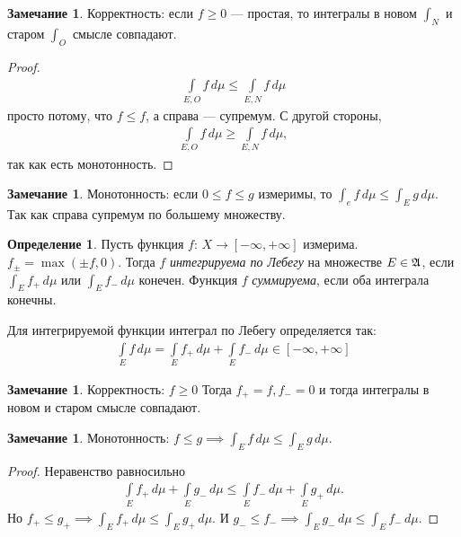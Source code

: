 \documentclass[a4paper,14pt]{extarticle}
\newcounter{theoremCnt}
\theoremstyle{definition}
\newtheorem{df}[theoremCnt]{Определение}
\theoremstyle{plain}
\theoremstyle{plain}
\theoremstyle{plain}
\theoremstyle{plain}
\theoremstyle{definition}
\theoremstyle{definition}
\newtheorem{remrk}[theoremCnt]{Замечание}
\theoremstyle{definition}
\theoremstyle{definition}
\theoremstyle{definition}
\theoremstyle{definition}
\theoremstyle{plain}
\theoremstyle{plain}
\theoremstyle{plain}
\theoremstyle{plain}
\theoremstyle{definition}
\theoremstyle{definition}
\theoremstyle{definition}
\theoremstyle{definition}
\theoremstyle{definition}
\newcommand{\A}{\ensuremath \mathfrak{A}}
\begin{document}
\begin{remrk}
 Корректность: если $f \geqslant 0$ --- простая, то интегралы в новом $\int_N$ и старом $\int_O$ смысле совпадают.
\end{remrk}
\begin{proof}
 \begin{align*}
  \int\limits_{E,O} f \, d\mu \leqslant \int\limits_{E,N} f \, d\mu
 \end{align*} просто потому, что $f \leqslant f$, а справа --- супремум. С другой стороны, \begin{align*}
  \int\limits_{E,O} f \, d\mu \geqslant \int\limits_{E,N} f \, d\mu
 ,\end{align*} так как есть монотонность.
\end{proof}
\begin{remrk}
 Монотонность: если $0 \leqslant f \leqslant g$ измеримы, то $\int_e f \, d\mu \leqslant 
 \int_E g\,d\mu$. Так как справа супремум по большему множеству.
\end{remrk}
\begin{df}
 Пусть функция $f \colon\, X \to [-\infty,+\infty] $ измерима. $f_{\pm} = \max(\pm f, 0)$. Тогда $f$ \textit{интегрируема по Лебегу} на множестве $E \in \A$, если $\int_E f_+ \, d\mu$  или $\int_E f_- \, d\mu$ конечен. Функция $f$ \textit{суммируема}, если оба интеграла конечны.

 Для интегрируемой функции интеграл по Лебегу определяется так: \begin{align*}
  \int\limits_E f \, d\mu = \int\limits_E f_+ \, d\mu + \int\limits_E f_- \, d\mu \in [-\infty,+\infty]
 \end{align*} 
\end{df}
\begin{remrk}
 Корректность: $f \geqslant 0$ Тогда $f_+= f, f_- = 0$ и тогда интегралы в новом и старом смысле совпадают.
\end{remrk}
\begin{remrk}
 Монотонность: $f \leqslant g \implies \int_E f \, d\mu \leqslant \int_E g \, d\mu$.
\end{remrk}
\begin{proof}
 Неравенство равносильно \begin{align*}
  \int\limits_E f_+ \, d\mu + \int\limits_E g_- \, d\mu \leqslant \int\limits_E f_- \, d\mu + \int\limits_E g_+ \, d\mu
 .\end{align*} Но $f_+ \leqslant g_+ \implies \int_E f_+ \, d\mu \leqslant \int_E g_+ \, d\mu$. И $g_- \leqslant f_- \implies \int_E g_- \, d\mu \leqslant \int_E f_- \, d\mu$.
\end{proof}
\end{document}
